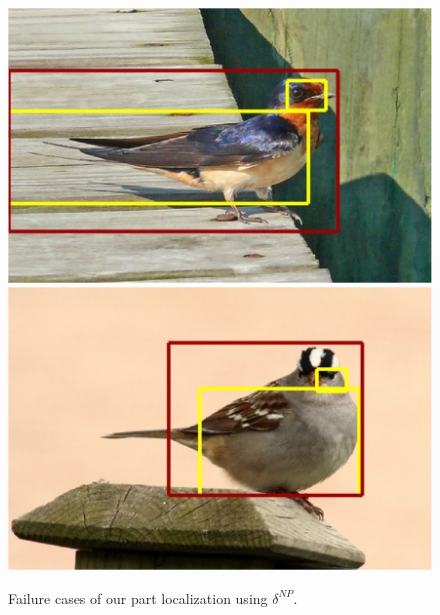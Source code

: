 \begin{figure}
\begin{center}
\includegraphics[height=0.2\linewidth]{47_neighbor.jpg} 
\includegraphics[height=0.2\linewidth]{91_neighbor.jpg} 
\end{center}
\caption{{Failure cases of our part localization using $\delta^{NP}$.}}
\label{fig:failure}
\end{figure}
